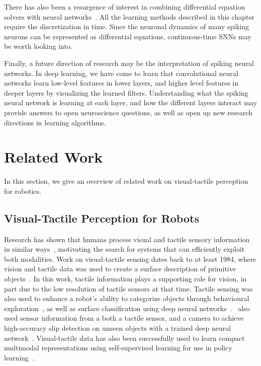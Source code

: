 \documentclass[fyp]{socreport}
\begin{document}
There has also been a resurgence of interest in combining differential equation
solvers with neural networks~\cite{NIPS2018_7892}. All the learning methods
described in this chapter require the discretization in time. Since the neuronal
dynamics of many spiking neurons can be represented as differential equations,
continuous-time SNNs may be worth looking into.

Finally, a future direction of research may be the interpretation of spiking
neural networks. In deep learning, we have come to learn that convolutional
neural networks learn low-level features in lower layers, and higher level
features in deeper layers by visualizing the learned filters. Understanding what
the spiking neural network is learning at each layer, and how the different
layers interact may provide answers to open neuroscience questions, as well as
open up new research directions in learning algorithms.

\chapter{Related Work\label{cha:related}}

In this section, we give an overview of related work on visual-tactile
perception for robotics.
\section{Visual-Tactile Perception for Robots}

Research has shown that humans process visual and tactile sensory information in
similar ways~\cite{Lacey:2015}, motivating the search for systems that can
efficiently exploit both modalities. Work on visual-tactile sensing dates back
to at least 1984, where vision and tactile data was used to create a surface
description of primitive objects~\cite{allenil_surfac}. In this work, tactile
information plays a supporting role for vision, in part due to the low
resolution of tactile sensors at that time. Tactile sensing was also used to
enhance a robot's ability to categorize objects through behavioural
exploration~\cite{sinapov14_learn}, as well as surface classification using deep
neural
networks~\cite{gao2016deep}.~\citeauthor{li18_slip_detec_combin_tactil_visual_infor}
also used sensor information from a both a tactile sensor, and a camera to
achieve high-accuracy slip detection on unseen objects with a trained deep
neural network~\cite{li18_slip_detec_combin_tactil_visual_infor}. Visual-tactile
data has also been successfully used to learn compact multimodal representations
using self-supervised learning for use in policy learning~\cite{lee2019making}.
\end{document}
